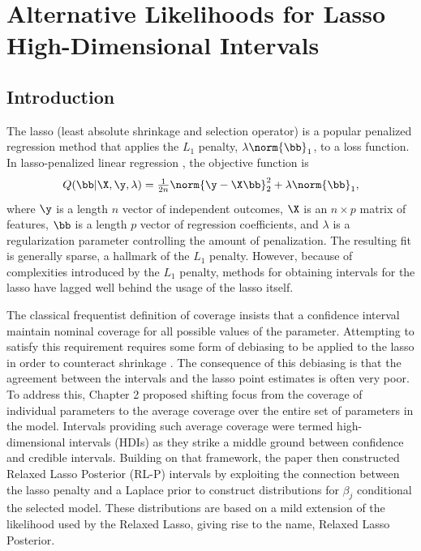 \chapter{Alternative Likelihoods for Lasso High-Dimensional Intervals}\label{sec:chap3}

\section{Introduction}

The lasso (least absolute shrinkage and selection operator) is a popular penalized regression method that applies the $L_1$ penalty, $\lambda\norm{\bb}_1$, to a loss function. In lasso-penalized linear regression \citep{Tibshirani1996}, the objective function is $$Q(\bb|\X,\y,\lambda) = \tfrac{1}{2n}\norm{\y - \X\bb}_2^2 + \lambda\norm{\bb}_1,$$ where $\y$ is a length $n$ vector of independent outcomes, $\X$ is an $n \times p$ matrix of features, $\bb$ is a length $p$ vector of regression coefficients, and $\lambda$ is a regularization parameter controlling the amount of penalization. The resulting fit is generally sparse, a hallmark of the $L_1$ penalty. However, because of complexities introduced by the $L_1$ penalty, methods for obtaining intervals for the lasso have lagged well behind the usage of the lasso itself. 

The classical frequentist definition of coverage insists that a confidence interval maintain nominal coverage for all possible values of the parameter. Attempting to satisfy this requirement requires some form of debiasing to be applied to the lasso in order to counteract shrinkage \citep{ZhangZhang2014, Javanmard2014, Lee2016}. The consequence of this debiasing is that the agreement between the intervals and the lasso point estimates is often very poor. To address this, Chapter 2 proposed shifting focus from the coverage of individual parameters to the average coverage over the entire set of parameters in the model. Intervals providing such average coverage were termed high-dimensional intervals (HDIs) as they strike a middle ground between confidence and credible intervals. Building on that framework, the paper then constructed Relaxed Lasso Posterior (RL-P) intervals by exploiting the connection between the lasso penalty and a Laplace prior to construct distributions for $\beta_j$ conditional the selected model. These distributions are based on a mild extension of the likelihood used by the Relaxed Lasso, giving rise to the name, Relaxed Lasso Posterior.

